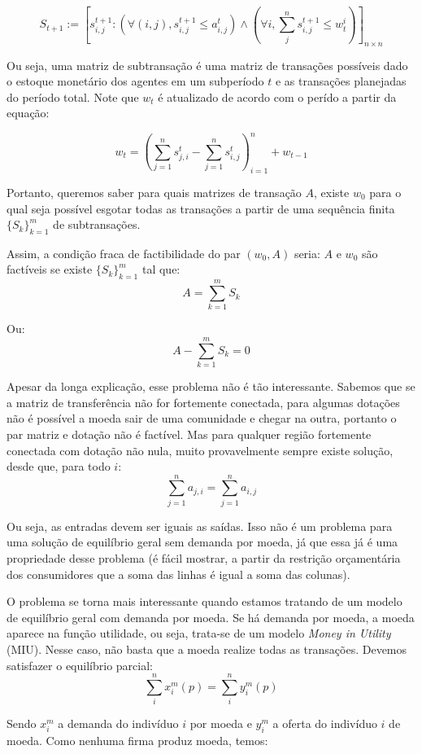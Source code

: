 \documentclass{article}
\begin{document}
$$ S_{t+1} := [s^{t+1}_{i,j}:(\forall(i,j), s^{t+1}_{i,j} \leq a^t_{i,j}) \land (\forall i, \sum^n_{j} s^{t+1}_{i,j} \leq w^i_t)]_{n \times n} $$

\par Ou seja, uma matriz de subtransação é uma matriz de transações possíveis dado o estoque monetário dos agentes em um subperíodo $t$ e as transações planejadas do período total. Note que $w_t$ é atualizado de acordo com o perído a partir da equação:

$$w_{t} = (\sum^n_{j=1}{s^{t}_{j,i}} -\sum^n_{j=1}{s^t_{i,j}}  )^n_{i=1}+w_{t-1}$$

\par Portanto, queremos saber para quais matrizes de transação $A$, existe $w_0$ para o qual seja possível esgotar todas as transações a partir de uma sequência finita $\{S_k\}^m_{k=1}$ de subtransações.
\par Assim, a condição fraca de factibilidade do par $(w_0, A)$ seria: $A$ e $w_0$ são factíveis se existe $\{S_k\}^m_{k=1}$ tal que:
$$ A = \sum^m_{k=1} S_k$$
\par Ou:
$$ A - \sum^m_{k=1} S_k = 0$$
\par Apesar da longa explicação, esse problema não é tão interessante. Sabemos que se a matriz de transferência não for fortemente conectada, para algumas dotações não é possível a moeda sair de uma comunidade e chegar na outra, portanto o par matriz e dotação não é factível. Mas para qualquer região fortemente conectada com dotação não nula, muito provavelmente sempre existe solução, desde que, para todo $i$:
$$\sum^n_{j=1}{a_{j,i}} = \sum^n_{j=1}{a_{i,j}}  $$
\par Ou seja, as entradas devem ser iguais as saídas. Isso não é um problema para uma solução de equilíbrio geral sem demanda por moeda, já que essa já é uma propriedade desse problema (é fácil mostrar, a partir da restrição orçamentária dos consumidores que a soma das linhas é igual a soma das colunas).
\par O problema se torna mais interessante quando estamos tratando de um modelo de equilíbrio geral com demanda por moeda. Se há demanda por moeda, a moeda aparece na função utilidade, ou seja, trata-se de um modelo \textit{Money in Utility} (MIU). Nesse caso, não basta que a moeda realize todas as transações. Devemos satisfazer o equilíbrio parcial:
$$ \sum^{n}_{i}x^m_i(p) = \sum^n_{i} y^m_i(p)$$
\par Sendo $x^m_i$ a demanda do indivíduo $i$ por moeda e $y^m_i$ a oferta do indivíduo $i$ de moeda. Como nenhuma firma produz moeda, temos:
\end{document}

